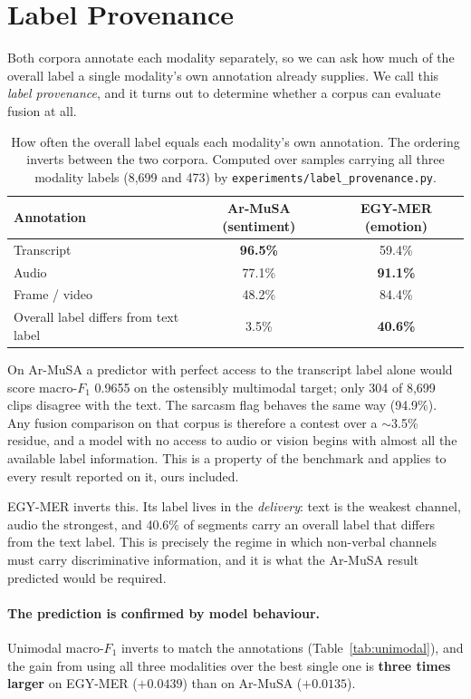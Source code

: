 \documentclass[12pt, a4paper]{article}
\begin{document}
\section{Label Provenance}
\label{sec:provenance}

Both corpora annotate each modality separately, so we can ask how much of the
overall label a single modality's own annotation already supplies. We call this
\emph{label provenance}, and it turns out to determine whether a corpus can
evaluate fusion at all.

\begin{table}[h]
\centering
\begin{tabular}{lcc}
\toprule
\textbf{Annotation} & \textbf{Ar-MuSA (sentiment)} & \textbf{EGY-MER (emotion)} \\
\midrule
Transcript & \textbf{96.5\%} & 59.4\% \\
Audio      & 77.1\% & \textbf{91.1\%} \\
Frame / video & 48.2\% & 84.4\% \\
\midrule
Overall label differs from text label & 3.5\% & \textbf{40.6\%} \\
\bottomrule
\end{tabular}
\caption{How often the overall label equals each modality's own annotation.
The ordering inverts between the two corpora. Computed over samples carrying all
three modality labels (8{,}699 and 473) by \texttt{experiments/label\_provenance.py}.}
\label{tab:provenance}
\end{table}

On Ar-MuSA a predictor with perfect access to the transcript label alone would
score macro-$F_1$ 0.9655 on the ostensibly multimodal target; only 304 of 8{,}699
clips disagree with the text. The sarcasm flag behaves the same way (94.9\%).
Any fusion comparison on that corpus is therefore a contest over a
$\sim$3.5\% residue, and a model with no access to audio or vision begins with
almost all the available label information. This is a property of the benchmark
and applies to every result reported on it, ours included.

EGY-MER inverts this. Its label lives in the \emph{delivery}: text is the
weakest channel, audio the strongest, and 40.6\% of segments carry an overall
label that differs from the text label. This is precisely the regime in which
non-verbal channels must carry discriminative information, and it is what the
Ar-MuSA result predicted would be required.

\paragraph{The prediction is confirmed by model behaviour.} Unimodal macro-$F_1$
inverts to match the annotations (Table~\ref{tab:unimodal}), and the gain from
using all three modalities over the best single one is \textbf{three times
larger} on EGY-MER ($+0.0439$) than on Ar-MuSA ($+0.0135$).
\end{document}
